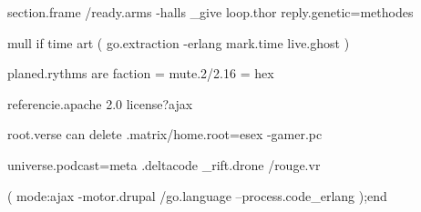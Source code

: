 section.frame /ready.arms -halls _give loop.thor reply.genetic=methodes

    {
        mull if time art (
            go.extraction -erlang mark.time live.ghost
        )
    }

            planed.rythms are faction = mute.2/2.16 = hex

                referencie.apache 2.0 license?ajax

            root.verse can delete .matrix/home.root=esex -gamer.pc

        universe.podcast=meta .deltacode _rift.drone /rouge.vr

            (
                mode:ajax -motor.drupal /go.language --process.code_erlang
            );end